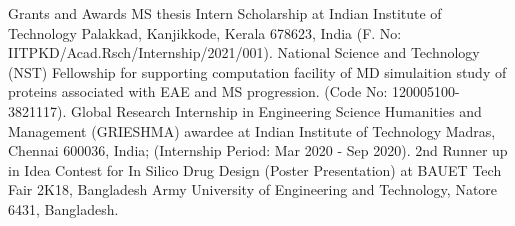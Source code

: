 
\begin{rubric}{Grants and Awards}
    \noentry{}
    \entry*[2022]
        MS thesis Intern Scholarship at Indian Institute of Technology Palakkad, Kanjikkode, Kerala 678623, India (F. No: IITPKD/Acad.Rsch/Internship/2021/001).
    \entry*[2021]
        National Science and Technology (NST) Fellowship for supporting computation facility of MD simulaition study of proteins associated with EAE and MS progression. (Code No: 120005100-3821117).
    \entry*[2020]
        Global Research Internship in Engineering Science Humanities and Management (GRIESHMA) awardee at Indian Institute of Technology Madras, Chennai 600036, India; (Internship Period: Mar 2020 - Sep 2020).
    \entry*[2018]
        2nd Runner up in Idea Contest for In Silico Drug Design (Poster Presentation) at BAUET Tech Fair 2K18, Bangladesh Army University of Engineering and Technology, Natore 6431, Bangladesh.
\end{rubric}
    